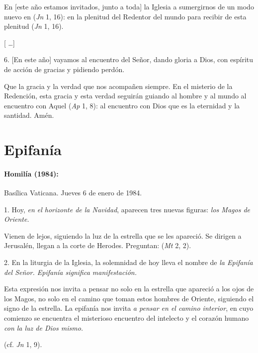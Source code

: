 \begin{body}
	En {[}este año estamos invitados, junto a toda{]} la Iglesia a sumergirnos de un modo nuevo en  (\emph{Jn} 1, 16): en la plenitud del Redentor del mundo para recibir de esta plenitud  (\emph{Jn} 1, 16).

	{[} \ldots{}{]}

	6. {[}En este año{]} vayamos al encuentro del Señor, dando gloria a Dios, con espíritu de acción de gracias y pidiendo perdón.

	Que la gracia y la verdad que  nos acompañen siempre. En el misterio de la Redención, esta gracia y esta verdad seguirán guiando al hombre y al mundo al encuentro con Aquel  (\emph{Ap} 1, 8): al encuentro con Dios que es la eternidad y la santidad. Amén.

	\chapter{Epifanía}

	\subsubsection{Homilía (1984):}

	Basílica Vaticana. Jueves 6 de enero de 1984.

	1. Hoy, \emph{en el horizonte de la Navidad}, aparecen tres nuevas figuras: \emph{los Magos de Oriente.}

	Vienen de lejos, siguiendo la luz de la estrella que se les apareció. Se dirigen a Jerusalén, llegan a la corte de Herodes. Preguntan:  (\emph{Mt} 2, 2).

	2. En la liturgia de la Iglesia, la solemnidad de hoy lleva el nombre de \emph{la Epifanía del Señor. Epifanía significa manifestación.}

	Esta expresión nos invita a pensar no solo en la estrella que apareció a los ojos de los Magos, no solo en el camino que toman estos hombres de Oriente, siguiendo el signo de la estrella. La epifanía nos invita \emph{a pensar en el camino interior}, en cuyo comienzo se encuentra el misterioso encuentro del intelecto y el corazón humano \emph{con la luz de Dios mismo.}

	 (cf. \emph{Jn} 1, 9).


\end{body}
